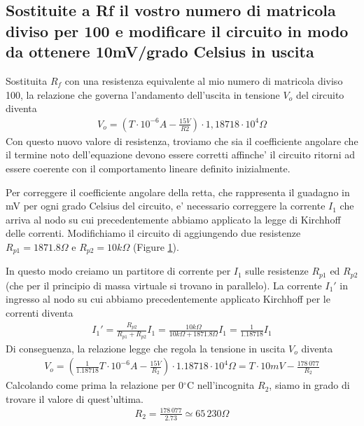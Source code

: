\documentclass[a4paper,10pt]{article}
\begin{document}
\pagebreak

\subsection{Sostituite a Rf il vostro numero di matricola diviso per 100 e modificare il circuito in modo da ottenere 10mV/grado Celsius in uscita}
Sostituita $R_f$ con una resistenza equivalente al mio numero di matricola diviso 100, la relazione che governa l'andamento dell'uscita in tensione $V_o$ del circuito diventa
\begin{align*}
V_o = (T\cdot 10^{-6}A - \frac{15V}{R2})\cdot 1,18718\cdot 10^4 \Omega
\end{align*}
Con questo nuovo valore di resistenza, troviamo che sia il coefficiente angolare che il termine noto dell'equazione devono essere corretti affinche' il circuito ritorni ad essere coerente con il comportamento lineare definito inizialmente.  \par

Per correggere il coefficiente angolare della retta, che rappresenta il guadagno in mV per ogni grado Celsius del circuito, e' necessario correggere la corrente $I_1$ che arriva al nodo su cui precedentemente abbiamo applicato la legge di Kirchhoff delle correnti. Modifichiamo il circuito di aggiungendo due resistenze $R_{p1}=1871.8\Omega$ e $R_{p2}=10k\Omega$ (Figure \ref{fig:ckt2mod}).
\begin{figure}[h!]
	\centering
  	\label{fig:ckt2mod}
\end{figure}
\par
In questo modo creiamo un partitore di corrente per $I_1$ sulle resistenze $R_{p1}$ ed $R_{p2}$ (che per il principio di massa virtuale si trovano in parallelo). La corrente $I_1'$ in ingresso al nodo su cui abbiamo precedentemente applicato Kirchhoff per le correnti diventa
\begin{align*}
I_1' =\frac{R_{p2}}{R_{p1}+R_{p2}} I_1 = \frac{10k\Omega}{10k\Omega+1871.8\Omega}I_1 = \frac{1}{1.18718}I_1
\end{align*} 
Di conseguenza, la relazione legge che regola la tensione in uscita $V_o$ diventa
\begin{align*}
V_o=(\frac{1}{1.18718}T\cdot10^{-6}A-\frac{15V}{R_2})\cdot 1.18718\cdot10^4\Omega = T\cdot10mV- \frac{178\,077}{R_2} 
\end{align*}
Calcolando come prima la relazione per 0$^{\circ}$C nell'incognita $R_2$, siamo in grado di trovare il valore di quest'ultima.
\begin{align*}
R_2 = \frac{178\,077}{2.73} \simeq 65\,230 \Omega
\end{align*}
\pagebreak
\end{document}
